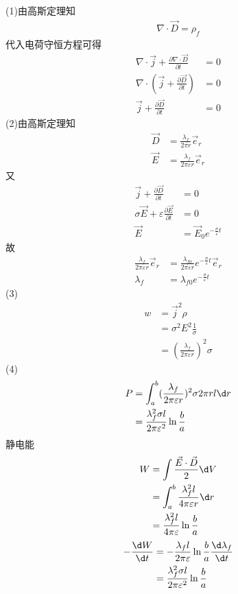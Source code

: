 \documentclass{phyasgn}
\begin{document}
\begin{sol}[7]
    (1)由高斯定理知
    \begin{align*}
        \nabla\cdot\vec{D}=\rho_f
    \end{align*}
    代入电荷守恒方程可得
    \begin{align*}
        \nabla\cdot\vec{j}+\frac{\partial\nabla\cdot\vec{D}}{\partial t}&=0\\
        \nabla\cdot(\vec{j}+\frac{\partial\vec{D}}{\partial t})&=0\\
        \vec{j}+\frac{\partial\vec{D}}{\partial t}&=0
    \end{align*}
    (2)由高斯定理知
    \begin{align*}
        \vec{D}&=\frac{\lambda_f}{2\pi r}\vec{e}_r\\
        \vec{E}&=\frac{\lambda_f}{2\pi\varepsilon r}\vec{e}_r
    \end{align*}
    又
    \begin{align*}
        \vec{j}+\frac{\partial\vec{D}}{\partial t}&=0\\
        \sigma \vec{E}+\varepsilon\frac{\partial\vec{E}}{\partial t}&=0\\
        \vec{E}&=\vec{E}_0e^{-\frac{\sigma}{\varepsilon}t}
    \end{align*}
    故
    \begin{align*}
        \frac{\lambda_f}{2\pi\varepsilon r}\vec{e}_r&=\frac{\lambda_{f0}}{2\pi\varepsilon r}e^{-\frac{\sigma}{\varepsilon}t}\vec{e}_r\\
        \lambda_f&=\lambda_{f0}e^{-\frac{\sigma}{\varepsilon}t}
    \end{align*}
    (3)\begin{align*}
        w&=\vec{j}^2\rho\\
        &=\sigma^2E^2\frac{1}{\sigma}\\
        &=(\frac{\lambda_f}{2\pi\varepsilon r})^2\sigma
    \end{align*}
    (4)\begin{align*}
        P&=\int_{a}^{b}(\frac{\lambda_f}{2\pi\varepsilon r})^2\sigma2\pi rl\d r\\
        &=\frac{\lambda_f^2\sigma l}{2\pi\varepsilon^2}\ln\frac{b}{a}
    \end{align*}
    静电能
    \begin{align*}
        W&=\int\frac{\vec{E}\cdot\vec{D}}{2}\d V\\
        &=\int_{a}^{b}\frac{\lambda_f^2l}{4\pi\varepsilon r}\d r\\
        &=\frac{\lambda_f^2l}{4\pi\varepsilon}\ln\frac{b}{a}
    \end{align*}
    \begin{align*}
        -\frac{\d W}{\d t}&=-\frac{\lambda_f l}{2\pi\varepsilon}\ln\frac{b}{a}\frac{\d \lambda_f}{\d t}\\
        &=\frac{\lambda_f^2\sigma l}{2\pi\varepsilon^2}\ln\frac{b}{a}
    \end{align*}
\end{sol}\par
\end{document}
